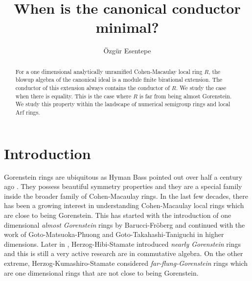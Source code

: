 \documentclass[12pt]{amsart}
\title{When is the canonical conductor minimal?}
\author[\"{O}.~Esentepe]{\"{O}zg\"{u}r Esentepe}
\theoremstyle{definition}
\begin{document}
\begin{abstract}
   For a one dimensional analytically unramified Cohen-Macaulay local ring $R$, the blowup algebra of the canonical ideal is a module finite birational extension. The conductor of this extension always contains the conductor of $R$. We study the case when there is equality. This is the case where $R$ is far from being almost Gorenstein. We study this property within the landscape of numerical semigroup rings and local Arf rings.
\end{abstract}

\maketitle
\thispagestyle{empty}

\section{Introduction}
Gorenstein rings are ubiquitous as Hyman Bass pointed out over half a century ago \cite{Bass}. They possess beautiful symmetry properties and they are a special family inside the broader family of Cohen-Macaulay rings. In the last few decades, there has been a growing interest in understanding Cohen-Macaulay local rings which are close to being Gorenstein. This has started with the introduction of one dimensional \textit{almost Gorenstein} rings by Barucci-Fr{\"o}berg \cite{Barucci-Froberg} and continued with the work of Goto-Matsuoka-Phuong \cite{Goto-Matsuoka-Phuong} and Goto-Takahashi-Taniguchi \cite{Goto-Takahashi-Taniguchi} in higher dimensions. Later in \cite{Herzog-Hibi-Stamate}, Herzog-Hibi-Stamate introduced \textit{nearly Gorenstein} rings and this is still a very active research are in commutative algebra. On the other extreme, Herzog-Kumashiro-Stamate \cite{Herzog-Kumashiro-Stamate} considered \textit{far-flung-Gorenstein} rings which are one dimensional rings that are not close to being Gorenstein.
\end{document}
